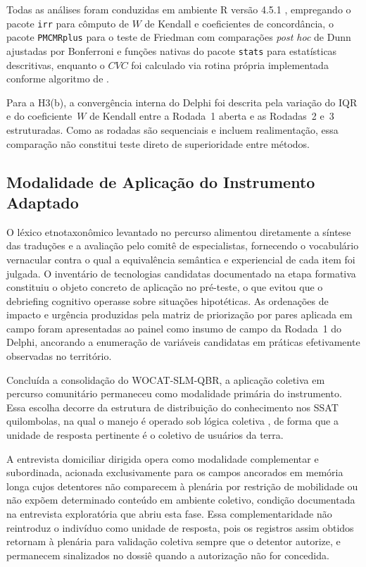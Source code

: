 \documentclass[preprint,authoryear,12pt]{elsarticle}
\begin{document}
Todas as análises foram conduzidas em ambiente R versão 4.5.1 \citep{RCore2024}, empregando o pacote \texttt{irr} para cômputo de $W$ de Kendall e coeficientes de concordância, o pacote \texttt{PMCMRplus} para o teste de Friedman com comparações \textit{post hoc} de Dunn ajustadas por Bonferroni e funções nativas do pacote \texttt{stats} para estatísticas descritivas, enquanto o $CVC$ foi calculado via rotina própria implementada conforme algoritmo de \citet{Hernandez-Nieto2002}.

Para a H3(b), a convergência interna do Delphi foi descrita pela variação do IQR e do coeficiente~$W$ de Kendall entre a Rodada~1 aberta e as Rodadas~2 e~3 estruturadas. Como as rodadas são sequenciais e incluem realimentação, essa comparação não constitui teste direto de superioridade entre métodos.

\subsection{Modalidade de Aplicação do Instrumento Adaptado}

O léxico etnotaxonômico levantado no percurso alimentou diretamente a síntese das traduções e a avaliação pelo comitê de especialistas, fornecendo o vocabulário vernacular contra o qual a equivalência semântica e experiencial de cada item foi julgada. O inventário de tecnologias candidatas documentado na etapa formativa constituiu o objeto concreto de aplicação no pré-teste, o que evitou que o debriefing cognitivo operasse sobre situações hipotéticas. As ordenações de impacto e urgência produzidas pela matriz de priorização por pares aplicada em campo foram apresentadas ao painel como insumo de campo da Rodada~1 do Delphi, ancorando a enumeração de variáveis candidatas em práticas efetivamente observadas no território.

Concluída a consolidação do WOCAT-SLM-QBR, a aplicação coletiva em percurso comunitário permaneceu como modalidade primária do instrumento. Essa escolha decorre da estrutura de distribuição do conhecimento nos SSAT quilombolas, na qual o manejo é operado sob lógica coletiva \citep{Ostrom1990,Toledo2008,Diegues2000}, de forma que a unidade de resposta pertinente é o coletivo de usuários da terra. 

A entrevista domiciliar dirigida opera como modalidade complementar e subordinada, acionada exclusivamente para os campos ancorados em memória longa cujos detentores não comparecem à plenária por restrição de mobilidade ou não expõem determinado conteúdo em ambiente coletivo, condição documentada na entrevista exploratória que abriu esta fase. Essa complementaridade não reintroduz o indivíduo como unidade de resposta, pois os registros assim obtidos retornam à plenária para validação coletiva sempre que o detentor autorize, e permanecem sinalizados no dossiê quando a autorização não for concedida.
\end{document}
